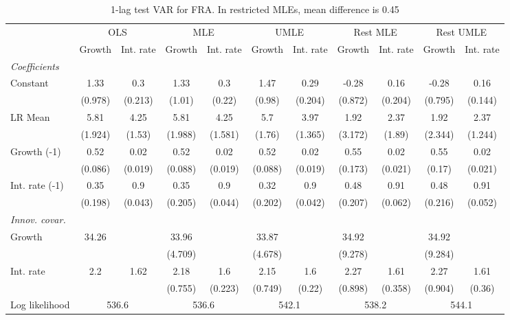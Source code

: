 \begin{table}[htbp] 
	\centering
	\begin{tabular}{@{\extracolsep{4pt}}lcccccccccc@{}}		\hline\hline
		 		 & \multicolumn{2}{c}{OLS} &\multicolumn{2}{c}{MLE} &\multicolumn{2}{c}{UMLE} &\multicolumn{2}{c}{Rest MLE} &\multicolumn{2}{c}{Rest UMLE} \\ 
 		 & Growth 	 & Int. rate 	 & Growth 	 & Int. rate 	 & Growth 	 & Int. rate 	 & Growth 	 & Int. rate 	 & Growth 	 & Int. rate\\\cline{2-3}\cline{4-5}\cline{6-7}\cline{8-9}\cline{10-11}
\rule{0pt}{4ex} 
 \emph{Coefficients} 	  		 & 		 & 		 & 		 & 		 & 		 & 		 & 		 & 		 & 		 &\\ 
\quad Constant 	 & 1.33 	 & 0.3 	 & 1.33 	 & 0.3 	 & 1.47 	 & 0.29 	 & -0.28 	 & 0.16 	 & -0.28 	 & 0.16	 \\ 
 		 & (0.978) 	 & (0.213) 	 & (1.01) 	 & (0.22) 	 & (0.98) 	 & (0.204) 	 & (0.872) 	 & (0.204) 	 & (0.795) 	 & (0.144) 	 \\ 
\quad LR Mean 	 & 5.81 	 & 4.25 	 & 5.81 	 & 4.25 	 & 5.7 	 & 3.97 	 & 1.92 	 & 2.37 	 & 1.92 	 & 2.37	 \\ 
 		 & (1.924) 	 & (1.53) 	 & (1.988) 	 & (1.581) 	 & (1.76) 	 & (1.365) 	 & (3.172) 	 & (1.89) 	 & (2.344) 	 & (1.244) 	 \\ 
\quad Growth (-1) 	 &0.52 	 & 0.02 	 & 0.52 	 & 0.02 	 & 0.52 	 & 0.02 	 & 0.55 	 & 0.02 	 & 0.55 	 & 0.02	 \\ 
 		 & (0.086) 	 & (0.019) 	 & (0.088) 	 & (0.019) 	 & (0.088) 	 & (0.019) 	 & (0.173) 	 & (0.021) 	 & (0.17) 	 & (0.021) 	 \\ 
\quad Int. rate (-1) 	 &0.35 	 & 0.9 	 & 0.35 	 & 0.9 	 & 0.32 	 & 0.9 	 & 0.48 	 & 0.91 	 & 0.48 	 & 0.91	 \\ 
 		 & (0.198) 	 & (0.043) 	 & (0.205) 	 & (0.044) 	 & (0.202) 	 & (0.042) 	 & (0.207) 	 & (0.062) 	 & (0.216) 	 & (0.052) 	 \\ 
\rule{0pt}{4ex} \emph{Innov. covar.}  	 & 	 & 	 & 	 & 	 & 	 & 	 & 	 & 	 & 	 &\\ 
\quad Growth 	 &34.26 	 &  	 & 33.96 	 &  	 & 33.87 	 &  	 & 34.92 	 &  	 & 34.92 	 & 	 \\ 
 		 &  	 &  	 & (4.709) 	 &  	 & (4.678) 	 &  	 & (9.278) 	 &  	 & (9.284) 	 &  	 \\ 
\quad Int. rate 	 &2.2 	 & 1.62 	 & 2.18 	 & 1.6 	 & 2.15 	 & 1.6 	 & 2.27 	 & 1.61 	 & 2.27 	 & 1.61	 \\ 
 		 &  	 &  	 & (0.755) 	 & (0.223) 	 & (0.749) 	 & (0.22) 	 & (0.898) 	 & (0.358) 	 & (0.904) 	 & (0.36) 	 \\ 
 \hline \rule{0pt}{4ex} 
  Log likelihood 	 &\multicolumn{2}{c}{536.6} 	 & \multicolumn{2}{c}{536.6} 	 & \multicolumn{2}{c}{542.1} 	 & \multicolumn{2}{c}{538.2} 	 & \multicolumn{2}{c}{544.1}\\ 

 \hline 	\end{tabular}		\caption{1-lag test VAR for FRA. In restricted MLEs, mean difference is 0.45}
		\label{tab:FRA1}

\end{table}